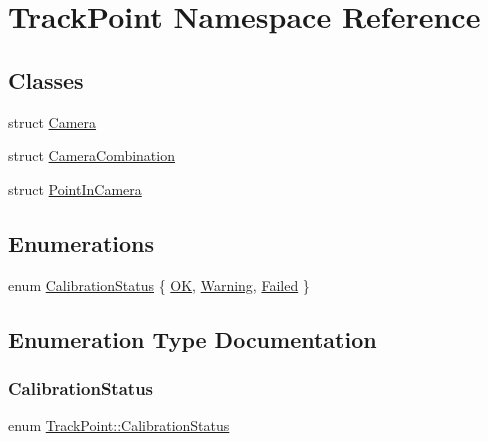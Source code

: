 \hypertarget{namespace_track_point}{}\section{Track\+Point Namespace Reference}
\label{namespace_track_point}
\subsection*{Classes}
\begin{DoxyCompactItemize}
\item 
struct \mbox{\hyperlink{struct_track_point_1_1_camera}{Camera}}
\item 
struct \mbox{\hyperlink{struct_track_point_1_1_camera_combination}{Camera\+Combination}}
\item 
struct \mbox{\hyperlink{struct_track_point_1_1_point_in_camera}{Point\+In\+Camera}}
\end{DoxyCompactItemize}
\subsection*{Enumerations}
\begin{DoxyCompactItemize}
\item 
enum \mbox{\hyperlink{namespace_track_point_acb9b2c2551da82b4cf9faf18d09335cd}{Calibration\+Status}} \{ \mbox{\hyperlink{namespace_track_point_acb9b2c2551da82b4cf9faf18d09335cdaeea0bf80079534c8f032d49c03cf60c2}{OK}}, 
\mbox{\hyperlink{namespace_track_point_acb9b2c2551da82b4cf9faf18d09335cda1a51f97e2ac16087bd82090c3b34ffd8}{Warning}}, 
\mbox{\hyperlink{namespace_track_point_acb9b2c2551da82b4cf9faf18d09335cda30a1c09ae421d4e88d3e4cee5ef546ec}{Failed}}
 \}
\end{DoxyCompactItemize}


\subsection{Enumeration Type Documentation}
\mbox{\label{namespace_track_point_acb9b2c2551da82b4cf9faf18d09335cd}} 
\subsubsection{\texorpdfstring{CalibrationStatus}{CalibrationStatus}}
{\footnotesize\ttfamily enum \mbox{\hyperlink{namespace_track_point_acb9b2c2551da82b4cf9faf18d09335cd}{Track\+Point\+::\+Calibration\+Status}}}

